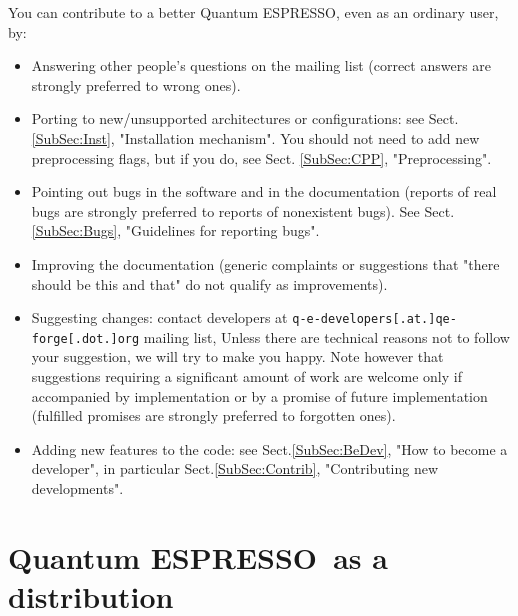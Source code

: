 \documentclass[12pt,a4paper]{article}
\def\qe{{\sc Quantum ESPRESSO}}
\begin{document}
You can contribute to a better \qe, even as an ordinary user, by:
\begin{itemize}
\item Answering other people's questions on the mailing list (correct
  answers are strongly preferred to wrong ones).
\item Porting to new/unsupported architectures or configurations: see
  Sect. \ref{SubSec:Inst}, "Installation mechanism". You should
  not need to add new preprocessing flags, but if you do,
  see Sect. \ref{SubSec:CPP}, "Preprocessing".
\item Pointing out bugs in the software and in the documentation
  (reports of real bugs are strongly preferred to reports of
  nonexistent bugs). See Sect. \ref{SubSec:Bugs}, "Guidelines
  for reporting bugs".
\item Improving the documentation (generic complaints or suggestions
  that "there should be this and that" do not qualify as improvements).
\item Suggesting changes: contact developers at
  \texttt{q-e-developers[.at.]qe-forge[.dot.]org} mailing list,
  Unless there are technical reasons not to follow your suggestion,
  we will try to make you happy. Note however that suggestions requiring
  a significant amount of work are welcome only if accompanied by
  implementation or by a promise of future implementation (fulfilled
  promises are strongly preferred to forgotten ones).
\item Adding new features to the code: see Sect.\ref{SubSec:BeDev},
  "How to become a developer", in particular Sect.\ref{SubSec:Contrib},
  "Contributing new developments".
\end{itemize}

\newpage

\section{\qe\ as a distribution}
\end{document}
